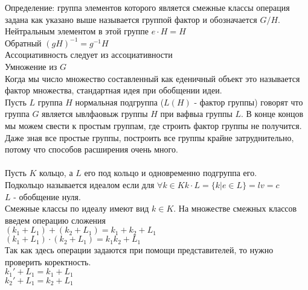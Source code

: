 Определение: группа элементов которого является смежные классы операция задана
как указано выше называется группой фактор и обозначается $G/H$.\\
Нейтральным элементом в этой группе $e\cdot H = H$\\
Обратный $(gH)^{-1} = g^{-1}H$\\
Ассоциативность следует из ассоциативности\\
Умножение из $G$\\
Когда мы число множество составленный как еденичный объект это называется фактор
множества, стандартная идея при обобщении идеи.\\
Пусть $L$ группа $H$ нормальная подгруппа ($L(H)$ - фактор группы) говорят что
группа $G$ является ывлфаовыж группы $H$ при вафвыа группы $L$. В конце концов
мы можем свести к простым группам, где строить фактор группы не получится.\\

Даже зная все простые группы, построить все группы крайне затруднительно,
потому что способов расширения очень много.\\

\\

Пусть $K$ кольцо, а $L$ его под кольцо и одновременно подгруппа его.\\
Подкольцо называется идеалом если для $\forall k \in K k\cdot L = \{k|e\in L\}
= lv = c$\\
$L$ - обобщение нуля.\\
Смежные классы по идеалу имеют вид $k\in K$. На множестве смежных классов введем
операцию сложения\\
$(k_1 + L_1) + (k_2 + L_1) = k_1 + k_2 + L_1$\\
$(k_1+L_1)\cdot(k_2+L_1) = k_1 k_2 + L_1$\\
Так как здесь операции задаются при помощи представителей, то нужно проверить
коректность.\\
$k_1' + L_1 = k_1 + L_1$\\
$k_2' + L_1 = k_2 + L_1$\\